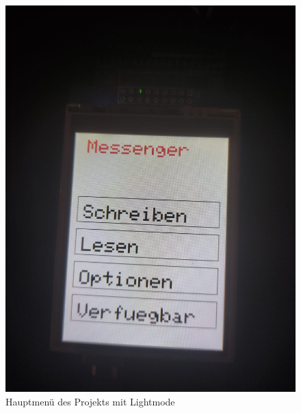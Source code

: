 \documentclass[a4paper, 11pt]{scrartcl}
\begin{document}
\begin{small}
\begin{figure}[H]
    \begin{center}
        \includegraphics[scale=0.13]{Bilder/MainMenu_Light.jpeg}
        \caption{Hauptmenü des Projekts mit Lightmode}\label{pic:main_light}
    \end{center}
\end{figure}


\end{small}
\end{document}

